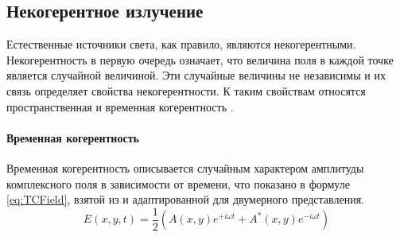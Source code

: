 \subsection{Некогерентное излучение}
Естественные источники света, как правило, являются некогерентными. Некогерентность в первую очередь означает, что величина поля в каждой точке является случайной величиной. Эти случайные величины не независимы и их связь определяет свойства некогерентности. К таким свойствам относятся пространственная и временная когерентность \cite{Ahmanov}.
\paragraph{Временная когерентность}
Временная когерентность описывается случайным характером амплитуды комплексного поля в зависимости от времени, что показано в формуле \ref{eq:TCField}, взятой из \cite{Ahmanov} и адаптированной для двумерного представления.
\begin{equation}\label{eq:TCField}
	E(x,y,t) = \frac{1}{2}\left(A(x,y)e^{+i{\omega}t} + A^*(x,y)e^{-i{\omega}t}\right)
\end{equation}